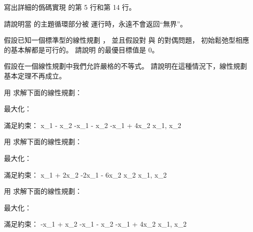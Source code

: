 \startsection[
  title={The initial basic feasible solution},
]

\startEXERCISE
寫出詳細的僞碼實現  的第 5 行和第 14 行。
\stopEXERCISE

\startANSWER
{}
\stopANSWER

\startEXERCISE
請說明當  的主題循環部分被  運行時，永遠不會返回“無界”。
\stopEXERCISE

\startANSWER
{}
\stopANSWER

\startEXERCISE
假設已知一個標準型的線性規劃 ，
並且假設對  與  的對偶問題，
初始鬆弛型相應的基本解都是可行的。
請說明  的最優目標值是 0。
\stopEXERCISE

\startANSWER
{}
\stopANSWER

\startEXERCISE
假設在一個線性規劃中我們允許嚴格的不等式。
請說明在這種情況下，線性規劃基本定理不再成立。
\stopEXERCISE

\startANSWER
{}
\stopANSWER

\startEXERCISE
用  求解下面的線性規劃：

最大化： 

滿足約束：
\startformula\startmathalignment[n=5,
align={right,right,right,right,middle}]
\NC  x_1 \NC - \NC  x_2 \NC \le {} \NR
\NC -x_1 \NC - \NC  x_2 \NC \le {} \NR
\NC -x_1 \NC + \NC 4x_2 \NC \le {} \NR
\NC     \NC x_1, \NC x_2 \NC \ge {} \NR
\stopmathalignment\stopformula
\stopEXERCISE

\startANSWER
{}
\stopANSWER

\startEXERCISE
用  求解下面的線性規劃：

最大化： 

滿足約束：
\startformula\startmathalignment[n=5,
align={right,right,right,right,middle}]
\NC   x_1 \NC + \NC 2x_2 \NC \le {} \NR
\NC -2x_1 \NC - \NC 6x_2 \NC \le {} \NR
\NC       \NC   \NC  x_2 \NC \le {} \NR
\NC     \NC x_1, \NC x_2 \NC \ge {} \NR
\stopmathalignment\stopformula
\stopEXERCISE

\startANSWER
{}
\stopANSWER

\startEXERCISE
用  求解下面的線性規劃：

最大化： 

滿足約束：
\startformula\startmathalignment[n=5,
align={right,right,right,right,middle}]
\NC  -x_1 \NC + \NC  x_2 \NC \le {} \NR
\NC  -x_1 \NC - \NC  x_2 \NC \le {} \NR
\NC  -x_1 \NC + \NC 4x_2 \NC \le {} \NR
\NC     \NC x_1, \NC x_2 \NC \ge {} \NR
\stopmathalignment\stopformula
\stopEXERCISE

